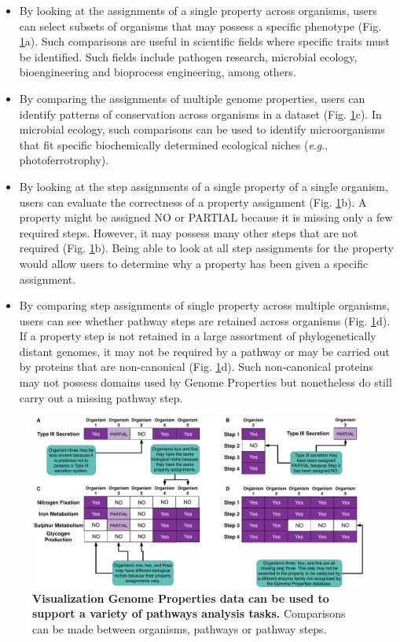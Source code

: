 \begin{itemize}
\item By looking at the assignments of a single property across organisms, users 
can select subsets of organisms that may possess a specific phenotype (Fig. 
\ref{fig:client-analysis-types}a). Such comparisons are useful in scientific 
fields where specific traits must be identified. Such fields include pathogen 
research, microbial ecology, bioengineering and bioprocess engineering, among 
others.
\item By comparing the assignments of multiple genome properties, users can 
identify patterns of conservation across organisms in a dataset (Fig. 
\ref{fig:client-analysis-types}c). In microbial ecology, such comparisons can be 
used to identify microorganisms that fit specific biochemically determined 
ecological niches (\textit{e}.\textit{g}., photoferrotrophy).
\item By looking at the step assignments of a single property of a single 
organism, users can evaluate the correctness of a property assignment (Fig. 
\ref{fig:client-analysis-types}b). A property might be assigned NO or PARTIAL 
because it is missing only a few required steps. However, it may possess many 
other steps that are not required (Fig. \ref{fig:client-analysis-types}b). Being 
able to look at all step assignments for the property would allow users to 
determine why a property has been given a specific assignment.
\item By comparing step assignments of single property across multiple 
organisms, users can see whether pathway steps are retained across organisms 
(Fig. \ref{fig:client-analysis-types}d). If a property step is not retained in a 
large assortment of phylogenetically distant genomes, it may not be required by 
a pathway or may be carried out by proteins that are non-canonical (Fig. 
\ref{fig:client-analysis-types}d). Such non-canonical proteins may not possess 
domains used by Genome Properties but nonetheless do still carry out a missing 
pathway step.
\end{itemize}

\begin{figure}[!ht]
  \centering
	\includegraphics[width=\textwidth]{media/analysis_types.pdf}
	 \caption[Visualization Genome Properties data can be used to support a variety 
of pathways analysis tasks.]{\textbf{Visualization Genome Properties data can be 
used to support a variety of pathways analysis tasks.} Comparisons can be made 
between organisms, pathways or pathway steps.}
	 \label{fig:client-analysis-types}
\end{figure}

